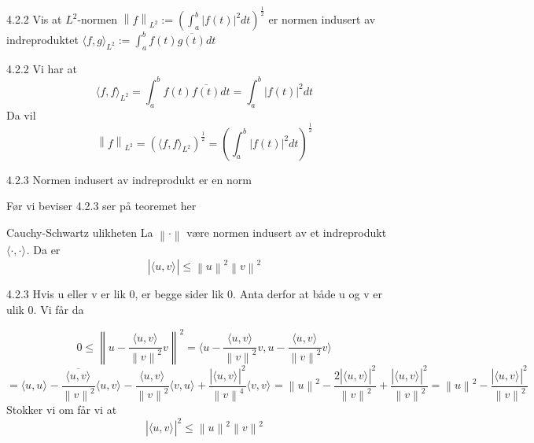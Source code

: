 \documentclass[a4paper,norsk]{article}
\renewcommand{\leq}{\leqslant}
\begin{document}
\begin{oppgavebox}{4.2.2}{}
Vis at $ L^2$-normen  $ \left\lVert f \right\rVert _{L^2} := \left( \int_{a}^{b} \left| f(t) \right| ^2 dt  \right)^{ \frac{ 1 }{ 2 }}  $  er normen indusert av indreproduktet $ \langle f, g \rangle_{ L^2 } := \int_{a}^{b} f(t) \overline{g(t)} dt  $ 

\begin{proofbox}{4.2.2}{}
Vi har at 
\[
    \langle f, f \rangle_{ L^2 } = \int_{a}^{b} f(t) \overline{f(t)}dt = \int_{a}^{b} \left| f(t) \right| ^2    dt  
\]
Da vil 
\[
    \left\lVert f \right\rVert _{ L^2} = \left( \langle f, f \rangle_{ L^2 }  \right) ^{ \frac{ 1 }{ 2 }} = \left( \int_{a}^{b} \left| f(t) \right| ^2    dt  \right) ^{ \frac{ 1 }{ 2 }}
\]



\end{proofbox}
\end{oppgavebox}

\begin{propositionbox}{4.2.3}{}
Normen indusert av indreprodukt er en norm
\end{propositionbox}

Før vi beviser 4.2.3 ser på teoremet her
\begin{theorembox}{Cauchy-Schwartz ulikheten}{}
La $ \left\lVert \cdot  \right\rVert  $ være normen indusert av et indreprodukt $ \langle \cdot, \cdot   \rangle_{  }  $. Da er
\[
    \left| \langle u, v \rangle_{  }  \right| \leq \left\lVert u \right\rVert ^2 \left\lVert v \right\rVert ^2
\]


\end{theorembox}

\begin{proofbox}{4.2.3}{}
    Hvis u eller v er lik 0, er begge sider lik 0. Anta derfor at både u og v er ulik 0. Vi får da

\[
    0 \leq \left\lVert u - \frac{ \langle u, v \rangle_{  }  }{ \left\lVert v \right\rVert ^2 } v \right\rVert ^2 = \langle u - \frac{ \langle u, v \rangle_{  }  }{ \left\lVert v \right\rVert ^2 } v, u - \frac{ \langle u, v \rangle_{  }  }{ \left\lVert v \right\rVert ^2 } v  \rangle_{  } 
\]
\[
    = \langle u, u \rangle_{  } - \frac{ \overline{ \langle u, v \rangle_{  } } }{ \left\lVert v \right\rVert ^2 } \langle u, v \rangle_{  } - \frac{ \langle u, v \rangle_{  }  }{ \left\lVert v \right\rVert ^2 } \langle v, u \rangle_{  } + \frac{ \left| \langle u, v \rangle_{  }  \right| ^2 }{ \left\lVert v \right\rVert ^4 } \langle v, v \rangle_{  } = \left\lVert u \right\rVert ^2 - \frac{ 2 \left| \langle u, v \rangle_{  }  \right| ^2 }{ \left\lVert v \right\rVert^2  } + \frac{ \left| \langle u, v \rangle_{  }  \right|^2  }{ \left\lVert v \right\rVert^2  } = \left\lVert u \right\rVert ^2 - \frac{ \left| \langle u, v \rangle_{  }  \right|^2  }{ \left\lVert v \right\rVert ^2 }
\]
Stokker vi om får vi at
\[
    \left| \langle u, v \rangle_{  }  \right|^2 \leq \left\lVert u \right\rVert ^2 \left\lVert v \right\rVert ^2 
\]
\end{proofbox}
\end{document}
